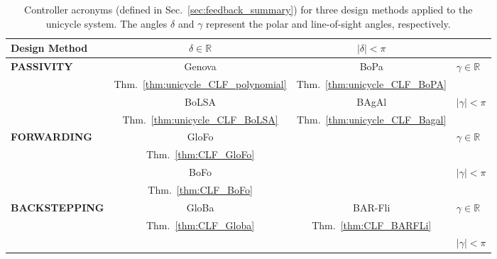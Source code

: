 \documentclass[journal,twoside,web]{ieeecolor}
\newcommand{\xmark}{\ding{55}}%
\theoremstyle{definition}
\newcommand{\R}{\mathbb{R}}
\begin{document}
\begin{table}[t]
\small
\renewcommand\arraystretch{1.2}
\begin{center}
\begin{tabular}{|l|c|c|l|} 
\hline
\textbf{Design Method} & $\delta\in\mathbb{R}$ & $|\delta| < \pi$ &  \\
\hline
\multirow{4}{*}{\textbf{PASSIVITY}} 
& Genova  & BoPa   & \multirow{2}{*}{ $\gamma \in  \R$}  \\
& Thm.~\ref{thm:unicycle_CLF_polynomial} & Thm.~\ref{thm:unicycle_CLF_BoPA} &
 \\
  \cline{2-4}
& BoLSA  & BAgAl   & \multirow{2}{*}{ $|\gamma| < \pi$}  \\
&Thm.~\ref{thm:unicycle_CLF_BoLSA} &Thm.~\ref{thm:unicycle_CLF_Bagal}  & \\
\hline
\multirow{4}{*}{\textbf{FORWARDING}} 
& GloFo  & \multirow{2}{*}{\xmark} & \multirow{2}{*}{$\gamma \in \mathbb{R}$}  \\ 
& Thm.~\ref{thm:CLF_GloFo} &  & \\
\cline{2-4}
& BoFo  & \multirow{2}{*}{\xmark} & \multirow{2}{*}{$|\gamma| < \pi$} \\ 
& Thm.~\ref{thm:CLF_BoFo} & & \\
\hline
\multirow{4}{*}{\textbf{BACKSTEPPING}} 
& GloBa  & BAR-Fli & \multirow{2}{*}{$\gamma \in \mathbb{R}$} \\
& Thm.~\ref{thm:CLF_Globa} & Thm.~\ref{thm:CLF_BARFLi} &
\\
\cline{2-4}
& \centering \xmark &  \xmark & $|\gamma| < \pi$ \\ 
\hline
\end{tabular}
\end{center}
\caption{Controller acronyms (defined in Sec.~\ref{sec:feedback_summary}) for three design methods applied to the unicycle system. 
The angles $\delta$ and $\gamma$ represent the polar and line-of-sight angles, respectively. }
\label{tab:controllers_summary}
\end{table}

\end{document}
